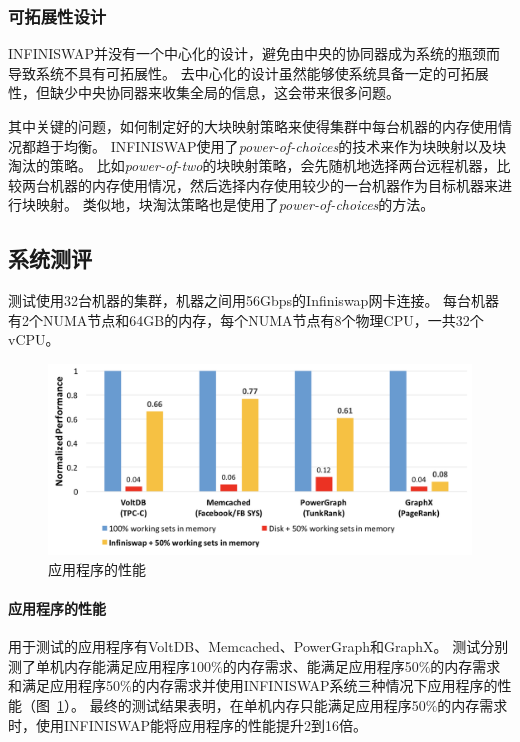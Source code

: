 \subsubsection{可拓展性设计}
INFINISWAP并没有一个中心化的设计，避免由中央的协同器成为系统的瓶颈而导致系统不具有可拓展性。
去中心化的设计虽然能够使系统具备一定的可拓展性，但缺少中央协同器来收集全局的信息，这会带来很多问题。

其中关键的问题，如何制定好的大块映射策略来使得集群中每台机器的内存使用情况都趋于均衡。
INFINISWAP使用了\emph{power-of-choices}的技术来作为块映射以及块淘汰的策略。
比如\emph{power-of-two}的块映射策略，会先随机地选择两台远程机器，比较两台机器的内存使用情况，然后选择内存使用较少的一台机器作为目标机器来进行块映射。
类似地，块淘汰策略也是使用了\emph{power-of-choices}的方法。

\subsection{系统测评}
测试使用32台机器的集群，机器之间用56Gbps的Infiniswap网卡连接。
每台机器有2个NUMA节点和64GB的内存，每个NUMA节点有8个物理CPU，一共32个vCPU。

\begin{figure}
\centering
\includegraphics[scale=0.4]{Figures/memory/infiniswap_evaluation1.png}
\decoRule
\caption{应用程序的性能}
\label{fig:infiniswap_evaluation1}
\end{figure}

\paragraph{应用程序的性能}
用于测试的应用程序有VoltDB、Memcached、PowerGraph和GraphX。
测试分别测了单机内存能满足应用程序100\%的内存需求、能满足应用程序50\%的内存需求和满足应用程序50\%的内存需求并使用INFINISWAP系统三种情况下应用程序的性能（图~\ref{fig:infiniswap_evaluation1}）。
最终的测试结果表明，在单机内存只能满足应用程序50\%的内存需求时，使用INFINISWAP能将应用程序的性能提升2到16倍。

